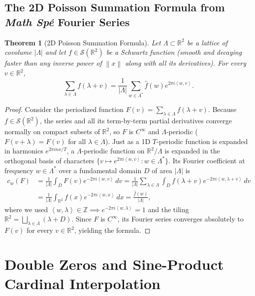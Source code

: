 \documentclass[11pt, a4paper]{article}
\newtheorem{theorem}{Theorem}[section]
\theoremstyle{definition}
\theoremstyle{remark}
\newcommand{\R}{\mathbb{R}}
\newcommand{\Z}{\mathbb{Z}}
\newcommand{\Scal}{\mathcal{S}}
\newcommand{\norm}[1]{\left\lVert #1 \right\rVert}
\newcommand{\abs}[1]{\left\lvert #1 \right\rvert}
\newcommand{\inner}[2]{\left\langle #1, #2 \right\rangle}
\begin{document}
\subsection{The 2D Poisson Summation Formula from \textit{Math Sp\'e} Fourier Series}
\begin{theorem}[2D Poisson Summation Formula]
\label{thm:poisson}
Let $\Lambda \subset \R^2$ be a lattice of covolume $\abs{\Lambda}$ and let $f \in \Scal(\R^2)$ be a Schwartz function (smooth and decaying faster than any inverse power of $\norm{x}$ along with all its derivatives). For every $v \in \R^2$,
\[
\sum_{\lambda \in \Lambda} f(\lambda + v) = \frac{1}{\abs{\Lambda}} \sum_{w \in \Lambda^*} \widehat{f}(w) e^{2\pi i \inner{w}{v}}.
\]
\end{theorem}
\begin{proof}
Consider the periodized function $F(v) = \sum_{\lambda \in \Lambda} f(\lambda + v)$. Because $f \in \Scal(\R^2)$, the series and all its term-by-term partial derivatives converge normally on compact subsets of $\R^2$, so $F$ is $C^\infty$ and $\Lambda$-periodic ($F(v + \lambda) = F(v)$ for all $\lambda \in \Lambda$). Just as a 1D $T$-periodic function is expanded in harmonics $e^{2\pi i n x / T}$, a $\Lambda$-periodic function on $\R^2/\Lambda$ is expanded in the orthogonal basis of characters $\{v \mapsto e^{2\pi i \inner{w}{v}} : w \in \Lambda^*\}$. Its Fourier coefficient at frequency $w \in \Lambda^*$ over a fundamental domain $D$ of area $\abs{\Lambda}$ is
\begin{align*}
c_w(F) &= \frac{1}{\abs{\Lambda}} \int_D F(v) e^{-2\pi i \inner{w}{v}} \, dv = \frac{1}{\abs{\Lambda}} \sum_{\lambda \in \Lambda} \int_D f(\lambda + v) e^{-2\pi i \inner{w}{\lambda + v}} \, dv \\
&= \frac{1}{\abs{\Lambda}} \int_{\R^2} f(x) e^{-2\pi i \inner{w}{x}} \, dx = \frac{\widehat{f}(w)}{\abs{\Lambda}},
\end{align*}
where we used $\inner{w}{\lambda} \in \Z \implies e^{-2\pi i \inner{w}{\lambda}} = 1$ and the tiling $\R^2 = \bigsqcup_{\lambda \in \Lambda} (\lambda + D)$. Since $F$ is $C^\infty$, its Fourier series converges absolutely to $F(v)$ for every $v \in \R^2$, yielding the formula.
\end{proof}

\section{Double Zeros and Sine-Product Cardinal Interpolation}
\label{app:sine}
\end{document}

